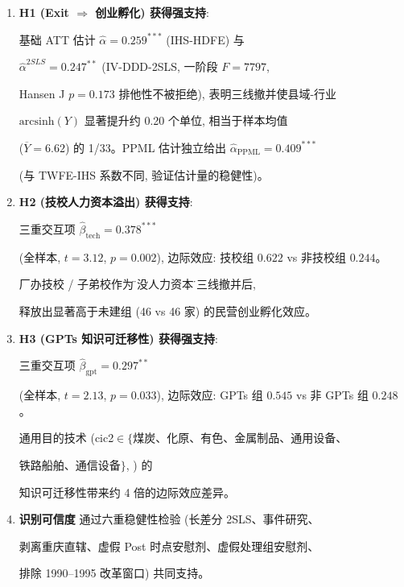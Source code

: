 \begin{enumerate}

\item \textbf{H1 (Exit $\Rightarrow$ 创业孵化) 获得强支持}:

       基础 ATT 估计 $\hat{\alpha}=0.259^{***}$ (IHS-HDFE) 与

       $\hat{\alpha}^{2SLS}=0.247^{**}$ (IV-DDD-2SLS, 一阶段 $F=7797$,

       Hansen J $p=0.173$ 排他性不被拒绝), 表明三线撤并使县域-行业

       $\mathrm{arcsinh}(Y)$ 显著提升约 0.20 个单位, 相当于样本均值

       ($\overline{Y}=6.62$) 的 1/33。PPML 估计独立给出 $\hat{\alpha}_{\mathrm{PPML}}=0.409^{***}$

       (与 TWFE-IHS 系数不同, 验证估计量的稳健性)。



\item \textbf{H2 (技校人力资本溢出) 获得支持}:

       三重交互项 $\hat{\beta}_{\mathrm{tech}}=0.378^{***}$

       (全样本, $t=3.12$, $p=0.002$), 边际效应: 技校组 $0.622$ vs 非技校组 $0.244$。

       厂办技校 / 子弟校作为\"沉没人力资本\"在三线撤并后,

       释放出显著高于未建组 (46 vs 46 家) 的民营创业孵化效应。



\item \textbf{H3 (GPTs 知识可迁移性) 获得强支持}:

       三重交互项 $\hat{\beta}_{\mathrm{gpt}}=0.297^{**}$

       (全样本, $t=2.13$, $p=0.033$), 边际效应: GPTs 组 $0.545$ vs 非 GPTs 组 $0.248$。

       通用目的技术 (cic2$\in\{$煤炭、化原、有色、金属制品、通用设备、

       铁路船舶、通信设备$\}$, \citet{bresnahan1995}) 的

       知识可迁移性带来约 4 倍的边际效应差异。



\item \textbf{识别可信度} 通过六重稳健性检验 (长差分 2SLS、事件研究、

       剥离重庆直辖、虚假 Post 时点安慰剂、虚假处理组安慰剂、

       排除 1990--1995 改革窗口) 共同支持。

\end{enumerate}



